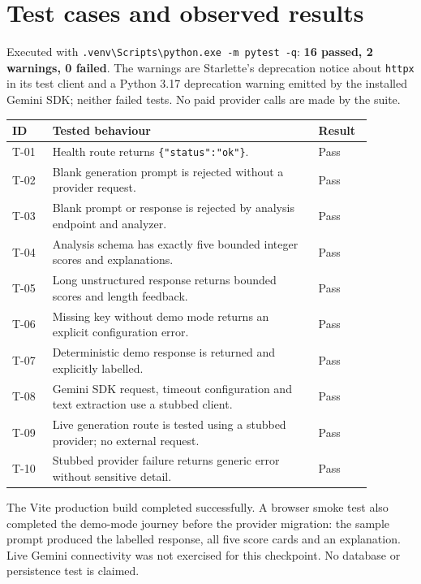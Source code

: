 \documentclass[11pt,a4paper]{article}
\begin{document}
\section{Test cases and observed results}
Executed with \verb|.venv\Scripts\python.exe -m pytest -q|:
\textbf{16 passed, 2 warnings, 0 failed}. The warnings are Starlette's
deprecation notice about \texttt{httpx} in its test client and a Python 3.17
deprecation warning emitted by the installed Gemini SDK; neither failed tests.
No paid provider calls are made by the suite.

{\small
\noindent
\begin{tabularx}{\linewidth}{@{}>{\raggedright\arraybackslash}p{0.10\linewidth} >{\raggedright\arraybackslash}p{0.66\linewidth} >{\centering\arraybackslash}p{0.12\linewidth}@{}}
\toprule
\textbf{ID} & \textbf{Tested behaviour} & \textbf{Result} \\
\midrule
T-01 & Health route returns \texttt{\{"status":"ok"\}}. & Pass \\
T-02 & Blank generation prompt is rejected without a provider request. & Pass \\
T-03 & Blank prompt or response is rejected by analysis endpoint and analyzer. & Pass \\
T-04 & Analysis schema has exactly five bounded integer scores and explanations. & Pass \\
T-05 & Long unstructured response returns bounded scores and length feedback. & Pass \\
T-06 & Missing key without demo mode returns an explicit configuration error. & Pass \\
T-07 & Deterministic demo response is returned and explicitly labelled. & Pass \\
T-08 & Gemini SDK request, timeout configuration and text extraction use a stubbed client. & Pass \\
T-09 & Live generation route is tested using a stubbed provider; no external request. & Pass \\
T-10 & Stubbed provider failure returns generic error without sensitive detail. & Pass \\
\bottomrule
\end{tabularx}
}

\noindent The Vite production build completed successfully. A browser smoke test
also completed the demo-mode journey before the provider migration: the sample
prompt produced the labelled response, all five score cards and an explanation.
Live Gemini connectivity was not exercised for this checkpoint. No database or
persistence test is claimed.
\end{document}
